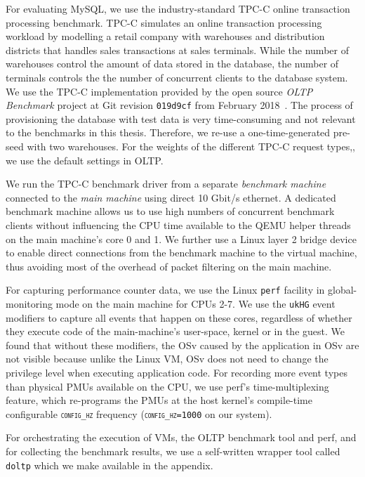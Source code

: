 \documentclass[12pt,a4paper]{book}
\begin{document}
For evaluating MySQL, we use the industry-standard TPC-C online transaction processing benchmark.
TPC-C simulates an online transaction processing workload by modelling a retail company with warehouses and distribution districts that handles sales transactions at sales terminals.
While the number of warehouses control the amount of data stored in the database, the number of terminals controls the the number of concurrent clients to the database system.~\cite{tpccSpec}
We use the TPC-C implementation provided by the open source \emph{OLTP Benchmark} project at Git revision \texttt{019d9cf} from February 2018~\cite{oltpbench}.
The process of provisioning the database with test data is very time-consuming and not relevant to the benchmarks in this thesis.
Therefore, we re-use a one-time-generated pre-seed with two warehouses.
For the weights of the different TPC-C request types,, we use the default settings in OLTP.

We run the TPC-C benchmark driver from a separate \emph{benchmark machine} connected to the \emph{main machine} using direct 10 Gbit/s ethernet.
A dedicated benchmark machine allows us to use high numbers of concurrent benchmark clients without influencing the CPU time available to the QEMU helper threads on the main machine's core 0 and 1.
We further use a Linux layer 2 bridge device to enable direct connections from the benchmark machine to the virtual machine, thus avoiding most of the overhead of packet filtering on the main machine.

For capturing performance counter data, we use the Linux \texttt{perf} facility in global-monitoring mode on the main machine for CPUs 2-7.
We use the \texttt{ukHG} event modifiers to capture all events that happen on these cores, regardless of whether they execute code of the main-machine's user-space, kernel or in the guest.
We found that without these modifiers, the OSv caused by the application in OSv are not visible because unlike the Linux VM, OSv does not need to change the privilege level when executing application code.
For recording more event types than physical PMUs available on the CPU, we use perf's time-multiplexing feature, which re-programs the PMUs at the host kernel's compile-time configurable \textsc{\texttt{config\_hz}} frequency (\textsc{\texttt{config\_hz=1000}} on our system).~\cite{perfTimeMultiplexing}

For orchestrating the execution of VMs, the OLTP benchmark tool and perf, and for collecting the benchmark results, we use a self-written wrapper tool called \texttt{doltp} which we make available in the appendix.
\end{document}
